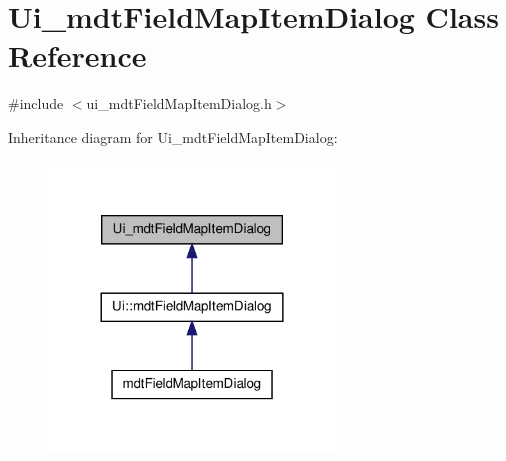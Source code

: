 \hypertarget{class_ui__mdt_field_map_item_dialog}{\section{Ui\-\_\-mdt\-Field\-Map\-Item\-Dialog Class Reference}
\label{class_ui__mdt_field_map_item_dialog}
}


{\ttfamily \#include $<$ui\-\_\-mdt\-Field\-Map\-Item\-Dialog.\-h$>$}



Inheritance diagram for Ui\-\_\-mdt\-Field\-Map\-Item\-Dialog\-:\nopagebreak
\begin{figure}[H]
\begin{center}
\leavevmode
\includegraphics[width=216pt]{class_ui__mdt_field_map_item_dialog__inherit__graph}
\end{center}
\end{figure}



